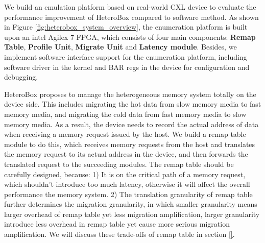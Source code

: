 

We build an emulation platform based on real-world CXL device to evaluate the performance improvement of HeteroBox compared to software method. 
As shown in Figure \ref{fig:heterobox_system_overview}, the enumeration platform is built upon an intel Agilex 7 FPGA, which consists of four main components: \textbf{Remap Table}, \textbf{Profile Unit}, \textbf{Migrate Unit} and \textbf{Latency module}. Besides, we implement software interface support for the enumeration platform, including software driver in the kernel and BAR regs in the device for configuration and debugging.


 HeteroBox proposes to manage the heterogeneous memory system totally on the device side. This includes migrating the hot data from slow memory media to fast memory media, and migrating the cold data from fast memory media to slow memory media. As a result, the device needs to record the actual address of data when receiving a memory request issued by the host. We build a remap table module to do this, which receives memory requests from the host and translates the memory request to its actual address in the device, and then forwards the translated request to the succeeding modules. The remap table should be carefully designed, because: 1) It is on the critical path of a memory request, which shouldn't introduce too much latency, otherwise it will affect the overall performance the memory system. 2) The translation granularity of remap table further determines the migration granularity, in which smaller granularity means larger overhead of remap table yet less migration amplification, larger granularity introduce less overhead in remap table yet cause more serious migration amplification. We will discuss these trade-offs of remap table in section \ref{}.



